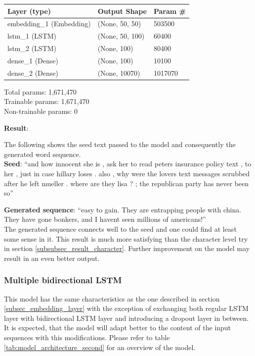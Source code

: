 \documentclass[conference]{IEEEtran}
\begin{document}
\begin{center}
\begin{tabular}{l l l}
\hline
Layer (type) & Output Shape & Param \#\\
\hline
\hline
embedding\_1 (Embedding) & (None, 50, 50) & 503500\\
\hline
lstm\_1 (LSTM) & (None, 50, 100) & 60400\\
\hline
lstm\_2 (LSTM) & (None, 100) & 80400\\
\hline
dense\_1 (Dense) & (None, 100) & 10100\\
\hline
dense\_2 (Dense) & (None, 10070) & 1017070\\
\hline
\hline
\end{tabular}
\begin{flushleft}
Total params: 1,671,470\\
Trainable params: 1,671,470\\
Non-trainable params: 0
\end{flushleft}
\end{center}

\textbf{Result}:

The following shows the seed text passed to the model and consequently the generated word sequence.\\

\textbf{Seed}: ``and how innocent she is , ask her to read peters insurance policy text , to her , just in case hillary loses . also , why were the lovers text messages scrubbed after he left mueller . where are they lisa ? ; the republican party has never been so''

\textbf{Generated sequence}: ``easy to gain. They are entrapping people with china. They have gone bonkers, and I havent seen millions of americans!''\\

The generated sequence connects well to the seed and one could find at least some sense in it. This result is much more satisfying than the character level try in section \ref{subsubsec_result_character}. Further improvement on the model may result in an even better output.

\subsubsection{Multiple bidirectional LSTM}\label{subsec_multi_bi_lstm}

This model has the same characteristics as the one described in section \ref{subsec_embedding_layer} with the exception of exchanging both regular LSTM layer with bidirectional LSTM layer and introducing a dropout layer in between. It is expected, that the model will adapt better to the content of the input sequences with this modifications. Please refer to table \ref{tab:model_architecture_second} for an overview of the model.
\end{document}
